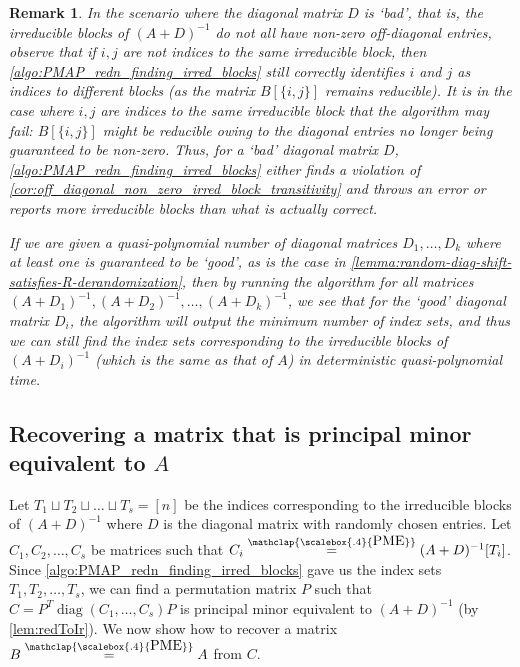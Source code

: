 \documentclass[11pt,letterpaper]{article}
\DeclareMathOperator*{\diag}{diag}
\newcommand{\F}{\mathbb{F}}
\newtheorem{lemma}{Lemma}[section]
\newtheorem{remark}{Remark}[section]
\newcommand{\PME}{\stackrel{\mathclap{\scalebox{.4}{\mbox{PME}}}}{=}}
\begin{document}
{{{\begin{remark}\label{remark:irred_blocks_finding_derandomisation}
    In the scenario where the diagonal matrix $D$ is `bad', that is, the irreducible blocks of $(A+D)^{-1}$ do not all have non-zero off-diagonal entries, observe that if $i,j$ are not indices to the same irreducible block, then \cref{algo:PMAP_redn_finding_irred_blocks} still correctly identifies $i$ and $j$ as indices to different blocks (as the matrix $B[\{i,j\}]$ remains reducible). It is in the case where $i,j$ are indices to the same irreducible block that the algorithm may fail: $B[\{i,j\}]$ might be reducible owing to the diagonal entries no longer being guaranteed to be non-zero. Thus, for a `bad' diagonal matrix $D$, \cref{algo:PMAP_redn_finding_irred_blocks} either finds a violation of \cref{cor:off_diagonal_non_zero_irred_block_transitivity} and throws an error or reports more irreducible blocks than what is actually correct.

    If we are given a quasi-polynomial number of diagonal matrices $D_1,\dots,D_k$ where at least one is guaranteed to be `good', as is the case in \cref{lemma:random-diag-shift-satisfies-R-derandomization}, then by running the algorithm for all matrices $(A+D_1)^{-1},(A+D_2)^{-1},\dots,(A+D_k)^{-1}$, we see that for the `good' diagonal matrix $D_i$, the algorithm will output the minimum number of index sets, and thus we can still find the index sets corresponding to the irreducible blocks of $(A+D_i)^{-1}$ (which is the same as that of $A$) in deterministic quasi-polynomial time.
\end{remark}


\subsection{Recovering a matrix that is principal minor equivalent to \texorpdfstring{$A$}{A}}

Let $T_1 \sqcup T_2 \sqcup \dots \sqcup T_s = [n]$ be the indices corresponding to the irreducible blocks of $(A+D)^{-1}$ where $D$ is the diagonal matrix with randomly chosen entries. Let $C_1, C_2, \dots, C_s$ be matrices such that $C_i \PME (A+D)^{-1}[T_i]$. Since \cref{algo:PMAP_redn_finding_irred_blocks} gave us the index sets $T_1,T_2,\dots,T_s$, we can find a permutation matrix $P$ such that $C = P^{T} \diag(C_1,\dots,C_s) P$ is principal minor equivalent to $(A+D)^{-1}$ (by \cref{lem:redToIr}). We now show how to recover a matrix $B \PME A$ from $C$.

}}}
\end{document}
